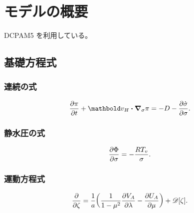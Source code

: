 \documentclass[body]{subfiles}
\begin{document}
\section{モデルの概要}
DCPAM5 を利用している。
\subsection{基礎方程式}
\subsubsection{連続の式}
\begin{equation}
	\pdv{\pi}{t}+\vc{v}_H\vdot\grad_\sigma\pi=-D-\pdv{\dot\sigma}{\sigma}.
\end{equation}
\subsubsection{静水圧の式}
\begin{equation}
	\pdv{\Phi}{\sigma}=-\frac{RT_v}{\sigma}.
\end{equation}
\subsubsection{運動方程式}
\begin{equation}
	\pdv{\zeta}=\frac{1}{a}\qty(\frac{1}{1-\mu^2}\pdv{V_A}{\lambda}-\pdv{U_A}{\mu})+\mathscr{D}[\zeta].
\end{equation}
\end{document}

